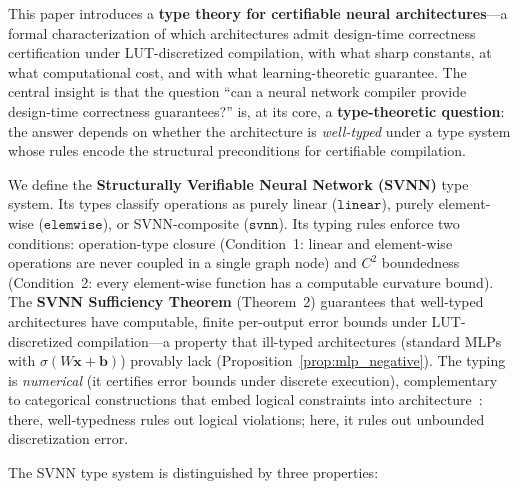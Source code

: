 \documentclass[journal,onecolumn]{IEEEtran}
\begin{document}
This paper introduces a \textbf{type theory for certifiable neural
architectures}---a formal characterization of which architectures admit
design-time correctness certification under LUT-discretized compilation,
with what sharp constants, at what computational cost, and with what
learning-theoretic guarantee. The central insight is that the question
``can a neural network compiler provide design-time correctness
guarantees?'' is, at its
core, a \textbf{type-theoretic question}: the answer depends on whether
the architecture is \textit{well-typed} under a type system whose rules
encode the structural preconditions for certifiable compilation.

We define the \textbf{Structurally Verifiable Neural Network (SVNN)}
type system. Its types classify operations as purely linear
($\texttt{linear}$), purely element-wise ($\texttt{elemwise}$), or
SVNN-composite ($\texttt{svnn}$). Its typing rules enforce two
conditions: operation-type closure (Condition~1: linear and element-wise
operations are never coupled in a single graph node) and $C^2$
boundedness (Condition~2: every element-wise function has a computable
curvature bound). The \textbf{SVNN Sufficiency Theorem} (Theorem~2)
guarantees that well-typed architectures have computable, finite
per-output error bounds under LUT-discretized compilation---a property that
ill-typed architectures (standard MLPs with $\sigma(W\mathbf{x}+\mathbf{b})$)
provably lack (Proposition~\ref{prop:mlp_negative}). The typing is
\emph{numerical} (it certifies error bounds under discrete execution),
complementary to categorical constructions that embed logical
constraints into architecture~\cite{nye2025categorical}: there,
well-typedness rules out logical violations; here, it rules out
unbounded discretization error.

The SVNN type system is distinguished by three properties:
\end{document}
